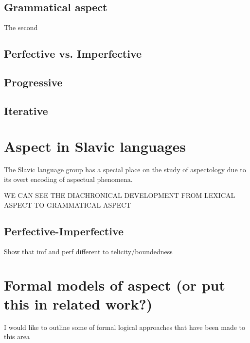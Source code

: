 \subsection*{\citet{moens-steedman-1988-temporal}}

\subsection{Grammatical aspect}
The second 
\subsection*{Perfective vs. Imperfective}
\subsection*{Progressive}
\subsection*{Iterative}

\section{Aspect in Slavic languages}
The Slavic language group has a special place on the study of aspectology due to its overt encoding of aspectual phenomena. 

WE CAN SEE THE DIACHRONICAL DEVELOPMENT FROM LEXICAL ASPECT TO GRAMMATICAL ASPECT

\subsection{Perfective-Imperfective}
Show that imf and perf different to telicity/boundedness

\section{Formal models of aspect (or put this in related work?)}
I would like to outline some of formal logical approaches that have been made to this area